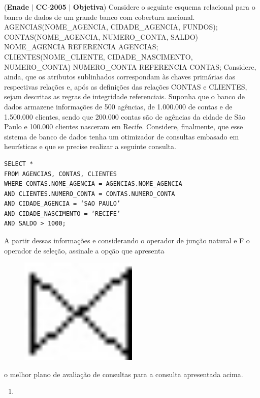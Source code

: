 \documentclass{exam}
\begin{document}
\begin{questions}
\question (\textbf{Enade} $|$ \textbf{CC}-\textbf{2005} $|$ \textbf{Objetiva})
Considere o seguinte esquema relacional para o banco de dados de um grande banco com cobertura nacional.
AGENCIAS(NOME\_AGENCIA, CIDADE\_AGENCIA, FUNDOS);
CONTAS(NOME\_AGENCIA, NUMERO\_CONTA, SALDO) NOME\_AGENCIA REFERENCIA AGENCIAS;
CLIENTES(NOME\_CLIENTE, CIDADE\_NASCIMENTO, NUMERO\_CONTA) NUMERO\_CONTA REFERENCIA CONTAS;
Considere, ainda, que os atributos sublinhados correspondam às chaves primárias das respectivas relações e, após as definições das
relações CONTAS e CLIENTES, sejam descritas as regras de integridade referenciais. Suponha que o banco de dados armazene
informações de 500 agências, de 1.000.000 de contas e de 1.500.000 clientes, sendo que 200.000 contas são de agências da cidade
de São Paulo e 100.000 clientes nasceram em Recife. Considere, finalmente, que esse sistema de banco de dados tenha um otimizador
de consultas embasado em heurísticas e que se precise realizar a seguinte consulta.
\begin{verbatim}
SELECT *
FROM AGENCIAS, CONTAS, CLIENTES
WHERE CONTAS.NOME_AGENCIA = AGENCIAS.NOME_AGENCIA
AND CLIENTES.NUMERO_CONTA = CONTAS.NUMERO_CONTA
AND CIDADE_AGENCIA = ‘SAO PAULO’
AND CIDADE_NASCIMENTO = ‘RECIFE’
AND SALDO > 1000;
\end{verbatim} 
A partir dessas informações e considerando  o operador de junção natural e F o operador de seleção, assinale a opção que apresenta
\begin{figure}[H]
	\begin{center}
		\includegraphics[width=0.5\textwidth]{CIENCIA_DA_COMPUTACAO_Prova2005-utf8_figuras/fig-0021.jpg}
	\end{center}
\end{figure}
o melhor plano de avaliação de consultas para a consulta apresentada acima.
	\begin{enumerate}[label=\alph*)]
		\item  
\begin{figure}[H]

\end{figure}
\end{enumerate}
\end{questions}
\end{document}
